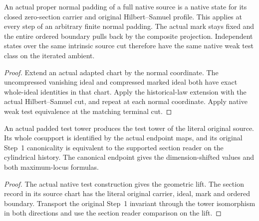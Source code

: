 \begin{theorem}
\label{hir:g1-actual-finite-normal-native-state}
\leanok
An actual proper normal padding of a full native source
is a native state for its closed zero-section carrier and
original Hilbert--Samuel profile. This applies at every
step of an arbitrary finite normal padding. The actual
mark stays fixed and the entire ordered boundary pulls
back by the composite projection. Independent states
over the same intrinsic source cut therefore have the
same native weak test class on the iterated ambient.
\end{theorem}
\begin{proof}
Extend an actual adapted chart by the normal coordinate.
The uncompressed vanishing ideal and compressed marked
ideal both have exact whole-ideal identities in that
chart. Apply the historical-law extension with the
actual Hilbert--Samuel cut, and repeat at each normal
coordinate. Apply native weak test equivalence at the
matching terminal cut.
\end{proof}

\begin{theorem}
\label{hir:g1-literal-native-section-reader}
\leanok
An actual padded test tower produces the test tower of
the literal original source. Its whole cosupport is
identified by the actual endpoint maps, and its original
Step~1 canonicality is equivalent to the supported
section reader on the cylindrical history. The canonical
endpoint gives the dimension-shifted values and both
maximum-locus formulas.
\end{theorem}
\begin{proof}
The actual native test construction gives the geometric
lift. The section record in its source chart has the
literal original carrier, ideal, mark and ordered
boundary. Transport the original Step~1 invariant
through the tower isomorphism in both directions and
use the section reader comparison on the lift.
\end{proof}

